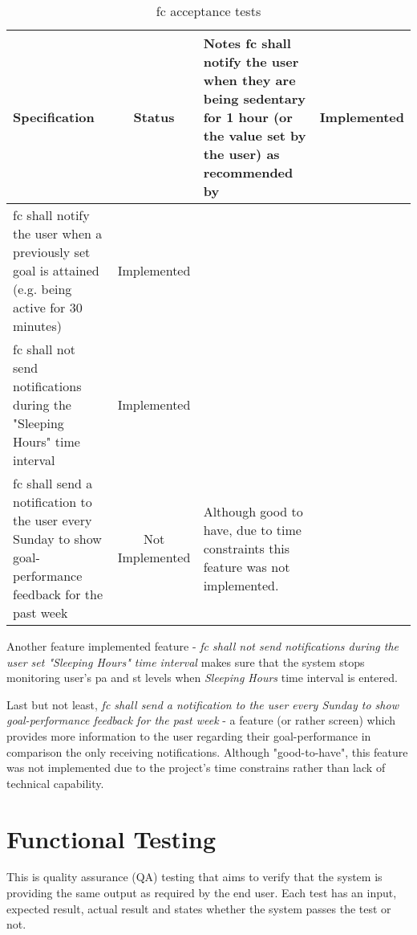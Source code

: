 \begin{table}[ht]
    \centering
    \tabulinesep=1.5mm
  \begin{longtabu} to \textwidth {|X|c|X|}
    \hline
      \textbf{Specification}
      & \textbf{Status}
      & \textbf{Notes}
    \endhead \hline
    \gls{fc} shall notify the user when they are being sedentary for 1 hour (or the value set by the user) as recommended by \citet[]{swartz2011}
    & Implemented
    & 
    \\ \hline
    \gls{fc} shall notify the user when a previously set goal is attained (e.g. being active for 30 minutes)
    & Implemented
    & 
    \\ \hline
    \gls{fc} shall not send notifications during the "Sleeping Hours" time interval
    & Implemented
    & 
    \\ \hline
    \gls{fc} shall send a notification to the user every Sunday to show goal-performance feedback for the past week
    & Not Implemented
    & Although good to have, due to time constraints this feature was not implemented.
    \\ \hline
 \end{longtabu}
    \caption{\gls{fc} acceptance tests}
    \label{tab:fc-acceptance-tests}
\end{table}

Another feature implemented feature - \textit{\gls{fc} shall not send notifications during the user set "Sleeping Hours" time interval} makes sure that the system stops monitoring user's \gls{pa} and \gls{st} levels when \textit{Sleeping Hours} time interval is entered. 

Last but not least, \textit{\gls{fc} shall send a notification to the user every Sunday to show goal-performance feedback for the past week} - a feature (or rather screen) which provides more information to the user regarding their goal-performance in comparison the only receiving notifications. Although "good-to-have", this feature was not implemented due to the project's time constrains rather than lack of technical capability.

\section{Functional Testing}
This is quality assurance (QA) testing that aims to verify that the system is providing the same output as required by the end user. Each test has an input, expected result, actual result and states whether the system passes the test or not.

